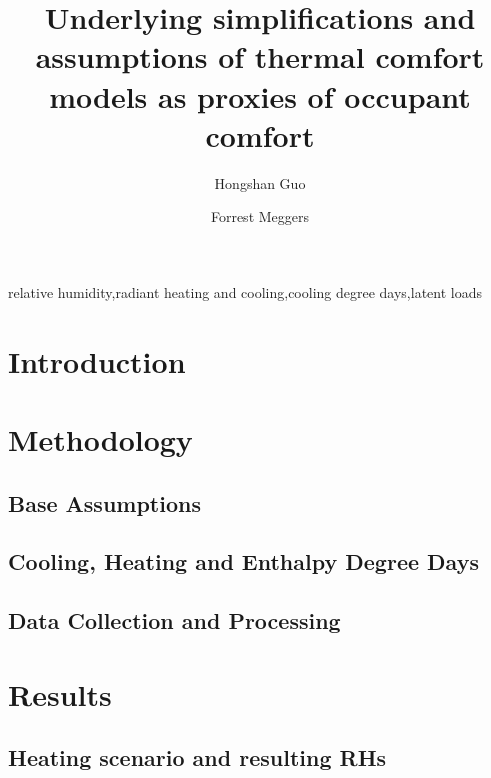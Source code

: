 \documentclass[review]{elsarticle}
\begin{document}
\begin{frontmatter}
\title{Underlying simplifications and assumptions of thermal comfort models as proxies of occupant comfort}
\author[mysecondaryaddress]{Hongshan Guo}
\author[mymainaddress,mysecondaryaddress]{Forrest Meggers}
\address[mymainaddress]{School of Architecture, Princeton University, USA}
\address[mysecondaryaddress]{Andlinger Center for Energy and the Environment, Princeton University, USA.}
\begin{abstract}

\end{abstract}
\begin{keyword}relative humidity\sep radiant heating and cooling\sep cooling degree days\sep latent loads\end{keyword}\end{frontmatter}
\tableofcontents
\section{Introduction}

\section{Methodology}
    \subsection{Base Assumptions}
            
    \subsection{Cooling, Heating and Enthalpy Degree Days}
        
    \subsection{Data Collection and Processing}
        
\section{Results}
    \subsection{Heating scenario and resulting RHs}
    
\end{document}
